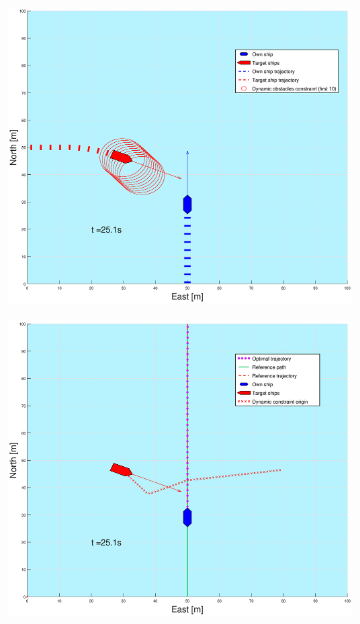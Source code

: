 \begin{figure}[!b]
\begin{subfigure}[b]{0.499\textwidth}
    \end{subfigure}
    \hfill
    \\
    \begin{subfigure}[b]{0.49\textwidth}
        \centering
        \includegraphics[width=\textwidth]{Images/Figures/enkel_SO/_Simple_0fig1_time=25}
    \end{subfigure}
    \hfill
    \begin{subfigure}[b]{0.499\textwidth}
        \centering
        \includegraphics[width=\textwidth]{Images/Figures/enkel_SO/_Simple_0fig999_time=25}
    \end{subfigure}
    \hfill
\end{figure}%
